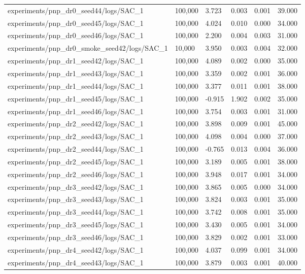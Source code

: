 \documentclass[11pt,a4paper,oneside]{book}
\begin{document}
\begin{longtable}{l l l l l l}
experiments/pnp\_dr0\_seed44/logs/SAC\_1 & 100,000 & 3.723 & 0.003 & 0.001 & 39.000 \\
experiments/pnp\_dr0\_seed45/logs/SAC\_1 & 100,000 & 4.024 & 0.010 & 0.000 & 34.000 \\
experiments/pnp\_dr0\_seed46/logs/SAC\_1 & 100,000 & 2.200 & 0.004 & 0.003 & 31.000 \\
experiments/pnp\_dr0\_smoke\_seed42/logs/SAC\_1 & 10,000 & 3.950 & 0.003 & 0.004 & 32.000 \\
experiments/pnp\_dr1\_seed42/logs/SAC\_1 & 100,000 & 4.089 & 0.002 & 0.000 & 35.000 \\
experiments/pnp\_dr1\_seed43/logs/SAC\_1 & 100,000 & 3.359 & 0.002 & 0.001 & 36.000 \\
experiments/pnp\_dr1\_seed44/logs/SAC\_1 & 100,000 & 3.377 & 0.011 & 0.001 & 38.000 \\
experiments/pnp\_dr1\_seed45/logs/SAC\_1 & 100,000 & -0.915 & 1.902 & 0.002 & 35.000 \\
experiments/pnp\_dr1\_seed46/logs/SAC\_1 & 100,000 & 3.754 & 0.003 & 0.001 & 31.000 \\
experiments/pnp\_dr2\_seed42/logs/SAC\_1 & 100,000 & 3.898 & 0.009 & 0.001 & 45.000 \\
experiments/pnp\_dr2\_seed43/logs/SAC\_1 & 100,000 & 4.098 & 0.004 & 0.000 & 37.000 \\
experiments/pnp\_dr2\_seed44/logs/SAC\_1 & 100,000 & -0.765 & 0.013 & 0.004 & 36.000 \\
experiments/pnp\_dr2\_seed45/logs/SAC\_1 & 100,000 & 3.189 & 0.005 & 0.001 & 38.000 \\
experiments/pnp\_dr2\_seed46/logs/SAC\_1 & 100,000 & 3.948 & 0.017 & 0.001 & 34.000 \\
experiments/pnp\_dr3\_seed42/logs/SAC\_1 & 100,000 & 3.865 & 0.005 & 0.000 & 34.000 \\
experiments/pnp\_dr3\_seed43/logs/SAC\_1 & 100,000 & 3.824 & 0.003 & 0.001 & 35.000 \\
experiments/pnp\_dr3\_seed44/logs/SAC\_1 & 100,000 & 3.742 & 0.008 & 0.001 & 35.000 \\
experiments/pnp\_dr3\_seed45/logs/SAC\_1 & 100,000 & 3.430 & 0.005 & 0.001 & 34.000 \\
experiments/pnp\_dr3\_seed46/logs/SAC\_1 & 100,000 & 3.829 & 0.002 & 0.001 & 33.000 \\
experiments/pnp\_dr4\_seed42/logs/SAC\_1 & 100,000 & 4.037 & 0.099 & 0.001 & 34.000 \\
experiments/pnp\_dr4\_seed43/logs/SAC\_1 & 100,000 & 3.879 & 0.003 & 0.001 & 40.000 \\

\end{longtable}
\end{document}
